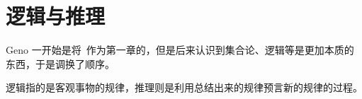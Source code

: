 \chapter{逻辑与推理}\label{ch:LogicAndInference}
    \small{Geno 一开始是将~作为第一章的，但是后来认识到集合论、逻辑等是更加本质的东西，于是调换了顺序。}

    逻辑指的是客观事物的规律，推理则是利用总结出来的规律预言新的规律的过程。

